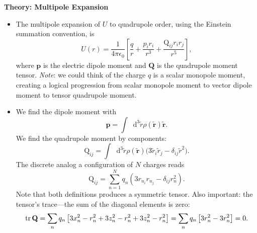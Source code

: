 \documentclass[11pt, a4paper]{article}
\newcommand{\diff}{\mathop{}\!\mathrm{d}} %
\renewcommand{\vec}[1]{\bm{#1}} %
\newcommand{\mat}[1]{\mathbf{#1}} %
\newcommand{\tvec}[1]{\tilde{\vec{#1}}} %
\newcommand{\ee}{\epsilon_{0}}  %
\begin{document}
\textbf{Theory: Multipole Expansion}
\begin{itemize}

	\item The multipole expansion of $ U $ to quadrupole order, using the Einstein summation convention, is
	\begin{equation*}
		U(r) = \frac{1}{4\pi \ee} \left[\frac{q}{r} + \frac{p_{i}r_{i}}{r^{3}} + \frac{\mathrm{Q}_{ij}r_{i}r_{j}}{r^{5}} \right],
	\end{equation*}
	where $ \vec{p} $ is the electric dipole moment and $ \mat{Q} $ is the quadrupole moment tensor. \textit{Note}: we could think of the charge $ q $ is a scalar monopole moment, creating a logical progression from scalar monopole moment to vector dipole moment to tensor quadrupole moment. 
	
	\item We find the dipole moment with 
	\begin{equation*}
		\vec{p} = \int  \diff^{3} \tilde{r} \rho(\tvec{r}) \tvec{r}.
	\end{equation*}
	We find the quadrupole moment by components:
	\begin{equation*}
		\mathrm{Q}_{ij} = \int  \diff^{3} \tilde{r} \rho(\tvec{r}) \big( 3\tilde{r}_{i}\tilde{r}_{j} - \delta_{ij}\tilde{r}^{2} \big).
	\end{equation*}
	The discrete analog a configuration of $ N $ charges reads
	\begin{equation*}
		\mathrm{Q}_{ij} = \sum_{n=1}^{N} q_{n} \left(3r_{n_{i}}r_{n_{j}} - \delta_{ij}r_{n}^{2}\right).
	\end{equation*}
	Note that both definitions produces a symmetric tensor. Also important: the tensor's trace---the sum of the diagonal elements is zero:
	\begin{equation*}
		\tr\mat{Q} = \sum_{n} q_{n}\left[3x_{n}^{2} - r_{n}^{2} + 3z_{n}^{2} - r_{n}^{2} + 3z_{n}^{2} - r_{n}^{2} \right] = \sum_{n}q_{n}\left[3r_{n}^{2} - 3r_{n}^{2}\right] = 0.
	\end{equation*}
\end{itemize}
\end{document}
